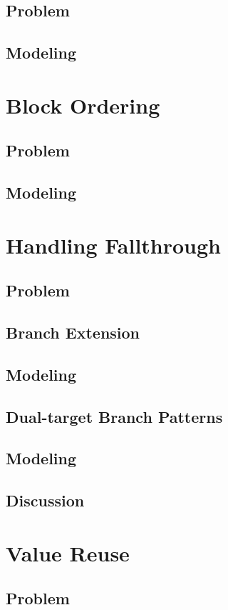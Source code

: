 \documentclass{book}
\begin{document}
\section{Problem}
\section{Modeling}

\chapter{Block Ordering}
\section{Problem}
\section{Modeling}

\chapter{Handling Fallthrough}
\section{Problem}
\section{Branch Extension}
\section{Modeling}
\section{Dual-target Branch Patterns}
\section{Modeling}
\section{Discussion}

\chapter{Value Reuse}
\section{Problem}
\end{document}
